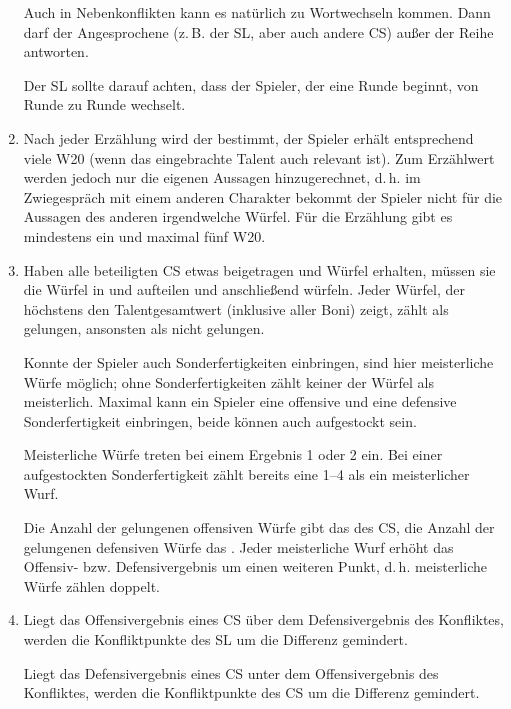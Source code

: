 \begin{enumerate}
  Auch in Nebenkonflikten kann es natürlich zu Wortwechseln kommen. Dann darf der Angesprochene (z.\,B. der SL, aber auch andere CS) außer der Reihe antworten.

  Der SL sollte darauf achten, dass der Spieler, der eine Runde beginnt, von Runde zu Runde wechselt.
  
  \item Nach jeder Erzählung wird der  bestimmt, der Spieler erhält entsprechend viele W20 {(wenn das eingebrachte Talent auch relevant ist)}. Zum Erzählwert werden jedoch nur die eigenen Aussagen hinzugerechnet, d.\,h. im Zwiegespräch mit einem anderen Charakter bekommt der Spieler nicht für die Aussagen des anderen irgendwelche Würfel. Für die Erzählung gibt es mindestens ein und maximal fünf W20.

  \item Haben alle beteiligten CS etwas beigetragen und Würfel erhalten, müssen sie die Würfel in  und  aufteilen und anschließend würfeln. Jeder Würfel, der höchstens den Talentgesamtwert (inklusive aller Boni) zeigt, zählt als gelungen, ansonsten als nicht gelungen. 
  
  Konnte der Spieler auch Sonderfertigkeiten einbringen, sind hier meisterliche Würfe möglich; ohne Sonderfertigkeiten zählt keiner der Würfel als meisterlich. Maximal kann ein Spieler eine offensive und eine defensive Sonderfertigkeit einbringen, beide können auch aufgestockt sein.

  Meisterliche Würfe treten bei einem Ergebnis 1 oder 2 ein. Bei einer aufgestockten Sonderfertigkeit zählt bereits eine 1--4 als ein meisterlicher Wurf.
  
  Die Anzahl der gelungenen offensiven Würfe gibt das  des CS, die Anzahl der gelungenen defensiven Würfe das . Jeder meisterliche Wurf erhöht das Offensiv- bzw. Defensivergebnis um einen weiteren Punkt, d.\,h. meisterliche Würfe zählen doppelt.

  \item Liegt das Offensivergebnis eines CS über dem Defensivergebnis des Konfliktes, werden die Konfliktpunkte des SL um die Differenz gemindert.
  
  Liegt das Defensivergebnis eines CS unter dem Offensivergebnis des Konfliktes, werden die Konfliktpunkte des CS um die Differenz gemindert.


\end{enumerate}
